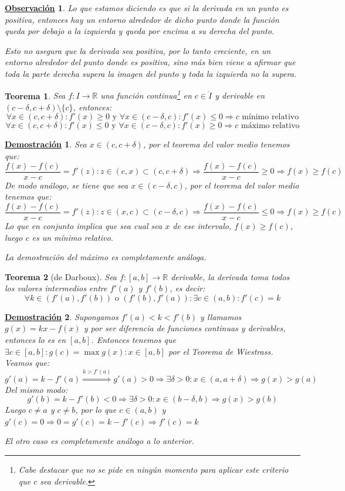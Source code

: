 \documentclass[10pt,a4paper,openright]{book}
\theoremstyle{break}
\newtheorem{theo}{Teorema}[chapter]
\newtheorem*{demo}{\underline{Demostración}}
\newtheorem{obs}{\underline{Observación}}[chapter]
\begin{document}
\begin{obs}
Lo que estamos diciendo es que si la derivada en un punto es positiva, entonces hay un entorno alrededor de dicho punto donde la función queda por debajo a la izquierda y queda por encima a su derecha del punto.

Esto no asegura que la derivada sea positiva, por lo tanto creciente, en un entorno alrededor del punto donde es positiva, sino más bien viene a afirmar que toda la parte derecha supera la imagen del punto y toda la izquierda no la supera.
\end{obs}

\begin{theo}
Sea $f:I\rightarrow \mathbb R$ una función continua\footnote{Cabe destacar que no se pide en ningún momento para aplicar este criterio que $c$ sea derivable.} en $c\in \mathring{I}$ y derivable en $(c-\delta,c+\delta)\setminus\{c\}$, entonces:
$$\forall x\in (c, c+\delta): f'(x)\geq 0 \mbox{ y } \forall x\in (c-\delta, c) : f'(x)\leq 0\Rightarrow c\mbox{ mínimo relativo}$$
$$\forall x\in (c, c+\delta) : f'(x)\leq 0 \mbox{ y } \forall x\in (c-\delta,c) : f'(x)\geq 0\Rightarrow c\mbox{ máximo relativo}$$
\end{theo}
\begin{demo}
Sea $x\in (c,c+\delta)$, por el teorema del valor medio tenemos que:
$$\frac{f(x)-f(c)}{x-c}=f'(z): z\in (c,x)\subset (c,c+\delta)\Rightarrow \frac{f(x)-f(c)}{x-c}\geq 0\Rightarrow f(x)\geq f(c)$$
De modo análogo, se tiene que sea $x\in (c-\delta,c)$, por el teorema del valor medio tenemos que:
$$\frac{f(x)-f(c)}{x-c}=f'(z): z\in (x,c)\subset (c-\delta,c)\Rightarrow \frac{f(x)-f(c)}{x-c}\leq 0\Rightarrow f(x)\geq f(c)$$
Lo que en conjunto implica que sea cual sea $x$ de ese intervalo, $f(x)\geq f(c)$, luego $c$ es un mínimo relativo.

La demostración del máximo es completamente análoga.
\end{demo}

\begin{theo}[de Darboux]
Sea $f:[a,b]\rightarrow \mathbb R$ derivable, la derivada toma todos los valores intermedios entre $f'(a)$ y $f'(b)$, es decir:
$$\forall k\in (f'(a), f'(b)) \mbox{ o } (f'(b), f'(a)): \exists c\in (a,b): f'(c)=k$$
\end{theo}

\begin{demo}
Supongamos $f'(a)<k<f'(b)$ y llamamos $g(x)=kx-f(x)$ y por ser diferencia de funciones continuas y derivables, entonces lo es en $[a,b]$. Entonces tenemos que $\exists c \in [a,b]: g(c)=\max{g(x)}: x\in [a,b]$ por el Teorema de Wiestrass. Veamos que:
$$g'(a)=k-f'(a)\stackrel{k>f'(a)}{\Rightarrow}g'(a)>0\Rightarrow \exists \delta>0: x\in (a, a+\delta)\Rightarrow g(x)>g(a)$$
Del mismo modo:
$$g'(b)=k-f'(b)<0\Rightarrow\exists \delta>0 : x\in (b-\delta, b)\Rightarrow g(x)>g(b)$$
Luego $c\neq a$ y $c\neq b$, por lo que $c\in (a,b)$ y $g'(c)=0\Rightarrow 0=g'(c)=k-f'(c)\Rightarrow f'(c)=k$

El otro caso es completamente análogo a lo anterior.
\end{demo}
\end{document}
